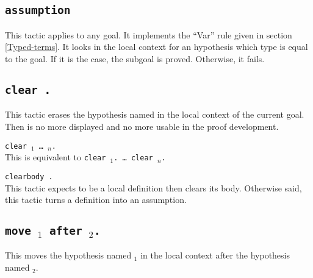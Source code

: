 \subsection{{\tt assumption}}
This tactic applies to any goal. It implements the
``Var'' rule given in section
\ref{Typed-terms}. It looks in the local context for an hypothesis
which type is equal to the goal.  If it is the case, the subgoal is
proved. Otherwise, it fails.

\begin{ErrMsgs}
\item  {}
\end{ErrMsgs}

\subsection{\tt clear {\ident}.}\label{clear}
This tactic erases the hypothesis named {\ident} in the local context
of the current goal. Then {\ident} is no more displayed and no more
usable in the proof development.

\begin{Variants}
\item {\tt clear {\ident$_1$} {\ldots} {\ident$_n$}.}\\
This is equivalent to {\tt clear {\ident$_1$}. {\ldots} clear {\ident$_n$}.}

\item {\tt clearbody {\ident}.}\\
This tactic expects {\ident} to be a local definition then clears its
body. Otherwise said, this tactic turns a definition into an assumption.
\end{Variants}

\begin{ErrMsgs}
\item {}
\item {}
\item {}
\end{ErrMsgs}

\subsection{\tt move {\ident$_1$} after {\ident$_2$}.}
This moves the hypothesis named {\ident$_1$} in the local context
after the hypothesis named {\ident$_2$}.

